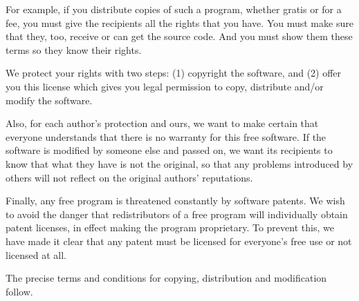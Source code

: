   For example, if you distribute copies of such a program, whether
gratis or for a fee, you must give the recipients all the rights that
you have.  You must make sure that they, too, receive or can get the
source code.  And you must show them these terms so they know their
rights.

  We protect your rights with two steps: (1) copyright the software, and
(2) offer you this license which gives you legal permission to copy,
distribute and/or modify the software.

  Also, for each author's protection and ours, we want to make certain
that everyone understands that there is no warranty for this free
software.  If the software is modified by someone else and passed on, we
want its recipients to know that what they have is not the original, so
that any problems introduced by others will not reflect on the original
authors' reputations.

  Finally, any free program is threatened constantly by software
patents.  We wish to avoid the danger that redistributors of a free
program will individually obtain patent licenses, in effect making the
program proprietary.  To prevent this, we have made it clear that any
patent must be licensed for everyone's free use or not licensed at all.

  The precise terms and conditions for copying, distribution and
modification follow.


